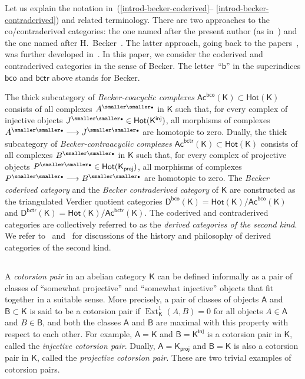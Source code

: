 \documentclass[12pt,a4paper]{amsart}
\newcommand{\+}{\nobreakdash-}
\renewcommand{\:}{\colon}
\newcommand{\rarrow}{\longrightarrow}
\newcommand{\bu}{{\text{\smaller\smaller$\scriptstyle\bullet$}}}
\DeclareMathOperator{\Ext}{Ext}
\newcommand{\sA}{\mathsf A}
\newcommand{\sB}{\mathsf B}
\newcommand{\sD}{\mathsf D}
\newcommand{\sK}{\mathsf K}
\newcommand{\Hot}{\mathsf{Hot}}
\newcommand{\Ac}{\mathsf{Ac}}
\newcommand{\proj}{\mathsf{proj}}
\newcommand{\inj}{\mathsf{inj}}
\newcommand{\bco}{\mathsf{bco}}
\newcommand{\bctr}{\mathsf{bctr}}
\theoremstyle{plain}
\theoremstyle{definition}
\begin{document}
 Let us explain the notation in~(\ref{introd-becker-coderived}\+-%
\ref{introd-becker-contraderived}) and related terminology.
 There are two approaches to the co/contraderived categories:
the one named after the present author (as in~\cite{Psemi,Pkoszul,EP})
and the one named after H.~Becker~\cite{Bec}.
 The latter approach, going back to the papers~\cite{Jor,Kra,Neem},
was further developed in~\cite{Sto2,PS4,PS5}.
 In this paper, we consider the coderived and contraderived
categories in the sense of Becker.
 The letter~``$\mathsf{b}$'' in the superindices $\bco$ and $\bctr$
above stands for Becker.

 The thick subcategory of \emph{Becker-coacyclic complexes}
$\Ac^\bco(\sK)\subset\Hot(\sK)$ consists of all complexes $A^\bu$
in $\sK$ such that, for every complex of injective objects
$J^\bu\in\Hot(\sK^\inj)$, all morphisms of complexes
$A^\bu\rarrow J^\bu$ are homotopic to zero.
 Dually, the thick subcategory of \emph{Becker-contraacyclic complexes}
$\Ac^\bctr(\sK)\subset\Hot(\sK)$ consists of all complexes $B^\bu$
in $\sK$ such that, for every complex of projective objects
$P^\bu\in\Hot(\sK_\proj)$, all morphisms of complexes
$P^\bu\rarrow B^\bu$ are homotopic to zero.
 The \emph{Becker coderived category} and the \emph{Becker contraderived
category} of $\sK$ are constructed as the triangulated Verdier
quotient categories $\sD^\bco(\sK)=\Hot(\sK)/\Ac^\bco(\sK)$ and
$\sD^\bctr(\sK)=\Hot(\sK)/\Ac^\bctr(\sK)$.
 The coderived and contraderived categories are collectively referred
to as the \emph{derived categories of the second kind}.
 We refer to~\cite[Remark~9.2]{PS4} and~\cite[Section~7]{Pksurv}
for discussions of the history and philosophy of derived categories
of the second kind.

\subsection{{}}
 A \emph{cotorsion pair} in an abelian category $\sK$ can be
defined informally as a pair of classes of ``somewhat projective'' and
``somewhat injective'' objects that fit together in a suitable sense.
 More precisely, a pair of classes of objects $\sA$ and $\sB\subset\sK$
is said to be a cotorsion pair if $\Ext^1_\sK(A,B)=0$ for all objects
$A\in\sA$ and $B\in\sB$, and both the classes $\sA$ and $\sB$ are
maximal with this property with respect to each other.
 For example, $\sA=\sK$ and $\sB=\sK^\inj$ is a cotorsion pair in $\sK$,
called the \emph{injective cotorsion pair}.
 Dually, $\sA=\sK_\proj$ and $\sB=\sK$ is also a cotorsion pair in
$\sK$, called the \emph{projective cotorsion pair}.
 These are two trivial examples of cotorsion pairs.
\end{document}
